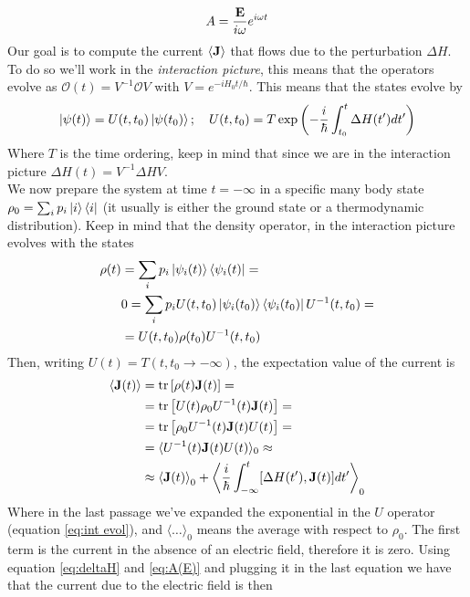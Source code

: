 \begin{equation}
    A=\frac{ \mathbf{E}}{i\omega}e^{i\omega t}
    \label{eq:A(E)}
\end{equation}
Our goal is to compute the current $\langle \mathbf{J}\rangle$ that flows due to the perturbation $\Delta H$. To do so we'll work in the \textit{interaction picture}, this means that the operators evolve as $\mathcal O(t)=V^{-1}\mathcal O V$ with $V=e^{-iH_0t/\hbar}$. This means that the states evolve by 
\begin{equation}
    \ket{\psi(t)}=U(t,t_0)\ket{\psi(t_0)}; \quad 
    U(t,t_0)=T\exp\left(-\frac i\hbar \int_{t_0}^t\Delta H(t')dt'\right)
    \label{eq:int evol}
\end{equation}
Where $T$ is the time ordering, keep in mind that since we are in the interaction picture $\Delta H(t)=V^{-1}\Delta HV$.\\
We now prepare the system at time $t=-\infty$ in a specific many body state $\rho_0=\sum_i p_i\ket{i}\bra{i}$ (it usually is either the ground state or a thermodynamic distribution). Keep in mind that the density operator, in the interaction picture evolves with the states
\begin{equation}
\begin{split}
        \rho(t)&=\sum_ip_i\ket{\psi_i(t)}\bra{\psi_i(t)}=\\
        &0=\sum_ip_iU(t,t_0)\ket{\psi_i(t_0)}\bra{\psi_i(t_0)}U^{-1}(t,t_0)=\\
        &=U(t,t_0)\rho(t_0)U^{-1}(t,t_0)
\end{split}
\end{equation}
Then, writing $U(t)=T(t,t_0\to-\infty)$, the expectation value of the current is
\begin{equation}
    \begin{split}
        \langle \mathbf{J}(t)\rangle &= \tr\left[\rho(t)\mathbf{J}(t)\right]=\\
        &=\tr\left[U(t)\rho_0 U^{-1}(t) \mathbf{J}(t)\right]=\\
        &=\tr\left[\rho_0 U^{-1}(t) \mathbf{J}(t)U(t)\right]=\\
        &=\langle U^{-1}(t) \mathbf{J}(t)U(t)\rangle_{0}\approx\\
        &\approx\left\langle\mathbf{J}(t)\right\rangle_{0} +
        \left\langle \frac i\hbar \int_{-\infty}^t[\Delta H(t'),\mathbf{J}(t)]dt'\right\rangle_0
    \end{split}
\end{equation}
Where in the last passage we've expanded the exponential in the $U$ operator (equation \ref{eq:int evol}), and $\langle \dots\rangle_0$ means the average with respect to $\rho_0$. The first term is the current in the absence of an electric field, therefore it is zero. Using equation \ref{eq:deltaH} and \ref{eq:A(E)} and plugging it in the last equation we have that the current due to the electric field is then
